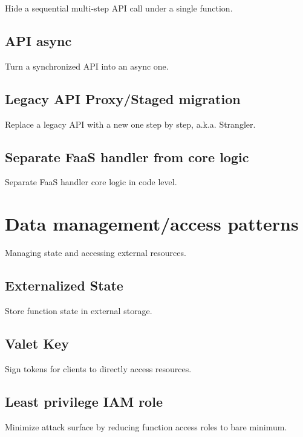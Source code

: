 Hide a sequential multi-step API call under a single function.

\subsection{API async} \label{subsubsec:apiAsync}

Turn a synchronized API into an async one.

\subsection{Legacy API Proxy/Staged migration} \label{subsubsec:legacyApi}

Replace a legacy API with a new one step by step, a.k.a. Strangler.

\subsection{Separate FaaS handler from core logic} \label
{subsubsec:separateHandler}

Separate FaaS handler core logic in code level.

\section{Data management/access patterns} \label{sec:dataManagementPatterns}

Managing state and accessing external resources.

\subsection{Externalized State} \label{subsubsec:externalizedState}

Store function state in external storage.

\subsection{Valet Key} \label{subsubsec:valetKey}

Sign tokens for clients to directly access resources.

\subsection{Least privilege IAM role} \label{subsubsec:LeastprivilegeIAMrole}

Minimize attack surface by reducing function access roles to bare minimum.


